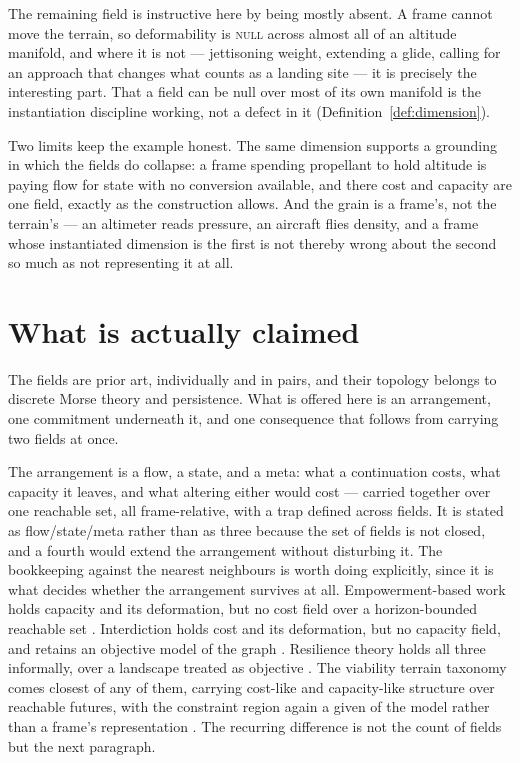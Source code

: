 \documentclass[11pt,a4paper]{article}
\theoremstyle{remark}
\begin{document}
The remaining field is instructive here by being mostly absent. A frame cannot move the terrain, so
deformability is \textsc{null} across almost all of an altitude manifold, and where it is not ---
jettisoning weight, extending a glide, calling for an approach that changes what counts as a landing
site --- it is precisely the interesting part. That a field can be null over most of its own manifold
is the instantiation discipline working, not a defect in it (Definition~\ref{def:dimension}).

Two limits keep the example honest. The same dimension supports a grounding in which the fields do
collapse: a frame spending propellant to hold altitude is paying flow for state with no conversion
available, and there cost and capacity are one field, exactly as the construction allows. And the
grain is a frame's, not the terrain's --- an altimeter reads pressure, an aircraft flies density, and
a frame whose instantiated dimension is the first is not thereby wrong about the second so much as
not representing it at all.

\section{What is actually claimed}\label{sec:claimed}

The fields are prior art, individually and in pairs, and their topology belongs to discrete Morse
theory and persistence. What is offered here is an arrangement, one commitment underneath it, and one
consequence that follows from carrying two fields at once.

The arrangement is a flow, a state, and a meta: what a continuation costs, what capacity it leaves,
and what altering either would cost --- carried together over one reachable set, all frame-relative,
with a trap defined across fields. It is stated as flow/state/meta rather than as three because the
set of fields is not closed, and a fourth would extend the arrangement without disturbing it. The
bookkeeping against the nearest neighbours is worth doing explicitly, since it is what decides
whether the arrangement survives at all. Empowerment-based work holds capacity and its deformation,
but no cost field over a horizon-bounded reachable set \citep{salge2014}. Interdiction holds cost and
its deformation, but no capacity field, and retains an objective model of the graph
\citep{israeli2002}. Resilience theory holds all three informally, over a landscape treated as
objective \citep{walker2004}. The viability terrain taxonomy comes closest of any of them, carrying
cost-like and capacity-like structure over reachable futures, with the constraint region again a
given of the model rather than a frame's representation \citep{heitzig2016}. The recurring difference
is not the count of fields but the next paragraph.
\end{document}
